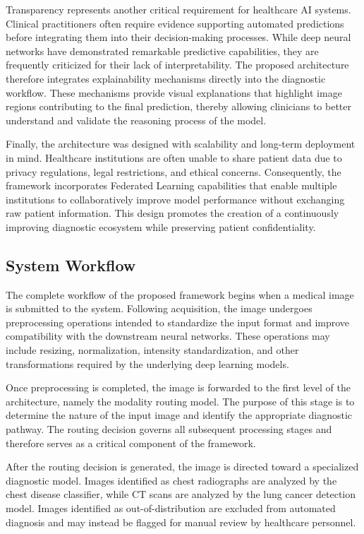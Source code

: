 Transparency represents another critical requirement for healthcare AI systems. Clinical practitioners often require evidence supporting automated predictions before integrating them into their decision-making processes. While deep neural networks have demonstrated remarkable predictive capabilities, they are frequently criticized for their lack of interpretability. The proposed architecture therefore integrates explainability mechanisms directly into the diagnostic workflow. These mechanisms provide visual explanations that highlight image regions contributing to the final prediction, thereby allowing clinicians to better understand and validate the reasoning process of the model.

Finally, the architecture was designed with scalability and long-term deployment in mind. Healthcare institutions are often unable to share patient data due to privacy regulations, legal restrictions, and ethical concerns. Consequently, the framework incorporates Federated Learning capabilities that enable multiple institutions to collaboratively improve model performance without exchanging raw patient information. This design promotes the creation of a continuously improving diagnostic ecosystem while preserving patient confidentiality.

\subsection{System Workflow}

The complete workflow of the proposed framework begins when a medical image is submitted to the system. Following acquisition, the image undergoes preprocessing operations intended to standardize the input format and improve compatibility with the downstream neural networks. These operations may include resizing, normalization, intensity standardization, and other transformations required by the underlying deep learning models.

Once preprocessing is completed, the image is forwarded to the first level of the architecture, namely the modality routing model. The purpose of this stage is to determine the nature of the input image and identify the appropriate diagnostic pathway. The routing decision governs all subsequent processing stages and therefore serves as a critical component of the framework.

After the routing decision is generated, the image is directed toward a specialized diagnostic model. Images identified as chest radiographs are analyzed by the chest disease classifier, while CT scans are analyzed by the lung cancer detection model. Images identified as out-of-distribution are excluded from automated diagnosis and may instead be flagged for manual review by healthcare personnel.

